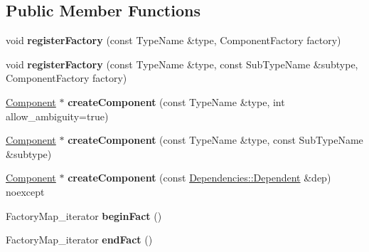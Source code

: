 \subsection*{Public Member Functions}
\begin{DoxyCompactItemize}
\item 
\hypertarget{classtheoria_1_1core_1_1Registry_ac7cd0cefa7207f2f6c602723cc32ee49}{void {\bfseries register\+Factory} (const Type\+Name \&type, Component\+Factory factory)}\label{classtheoria_1_1core_1_1Registry_ac7cd0cefa7207f2f6c602723cc32ee49}

\item 
\hypertarget{classtheoria_1_1core_1_1Registry_a861b9906b6e10bdebc74ec7397ea971a}{void {\bfseries register\+Factory} (const Type\+Name \&type, const Sub\+Type\+Name \&subtype, Component\+Factory factory)}\label{classtheoria_1_1core_1_1Registry_a861b9906b6e10bdebc74ec7397ea971a}

\item 
\hypertarget{classtheoria_1_1core_1_1Registry_a846b6ea01b2c4d3d1276796e9ef2b32b}{\hyperlink{classtheoria_1_1core_1_1Component}{Component} $\ast$ {\bfseries create\+Component} (const Type\+Name \&type, int allow\+\_\+ambiguity=true)}\label{classtheoria_1_1core_1_1Registry_a846b6ea01b2c4d3d1276796e9ef2b32b}

\item 
\hypertarget{classtheoria_1_1core_1_1Registry_a22ddcd3c1f46bd171cb9d704889a8a07}{\hyperlink{classtheoria_1_1core_1_1Component}{Component} $\ast$ {\bfseries create\+Component} (const Type\+Name \&type, const Sub\+Type\+Name \&subtype)}\label{classtheoria_1_1core_1_1Registry_a22ddcd3c1f46bd171cb9d704889a8a07}

\item 
\hypertarget{classtheoria_1_1core_1_1Registry_aab152e6e19be2b33f13bb82e77aca917}{\hyperlink{classtheoria_1_1core_1_1Component}{Component} $\ast$ {\bfseries create\+Component} (const \hyperlink{structtheoria_1_1core_1_1Dependencies_1_1Dependent}{Dependencies\+::\+Dependent} \&dep) noexcept}\label{classtheoria_1_1core_1_1Registry_aab152e6e19be2b33f13bb82e77aca917}

\item 
\hypertarget{classtheoria_1_1core_1_1Registry_a0a7c747a611355e212e026e128acd322}{Factory\+Map\+\_\+iterator {\bfseries begin\+Fact} ()}\label{classtheoria_1_1core_1_1Registry_a0a7c747a611355e212e026e128acd322}

\item 
\hypertarget{classtheoria_1_1core_1_1Registry_ac88948c696663ae6f7ba3ece5c2fdcc9}{Factory\+Map\+\_\+iterator {\bfseries end\+Fact} ()}\label{classtheoria_1_1core_1_1Registry_ac88948c696663ae6f7ba3ece5c2fdcc9}


\end{DoxyCompactItemize}
